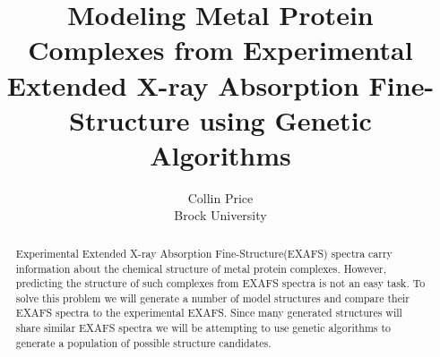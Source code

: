 \documentclass[12pt,letterpaper,draft,notitlepage]{article}
\title{Modeling Metal Protein Complexes from Experimental Extended X-ray Absorption Fine-Structure using Genetic Algorithms}
\author{Collin Price \\ Brock University}
\begin{document}
\maketitle
\thispagestyle{empty}

\begin{abstract}

Experimental Extended X-ray Absorption Fine-Structure(EXAFS) spectra carry information about the chemical structure of metal protein complexes. However, predicting the structure of such complexes from EXAFS spectra is not an easy task. To solve this problem we will generate a number of model structures and compare their EXAFS spectra to the experimental EXAFS. Since many generated structures will share similar EXAFS spectra we will be attempting to use genetic algorithms to generate a population of possible structure candidates.

\end{abstract}
\end{document}
